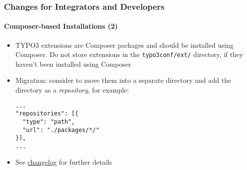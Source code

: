 %

\begin{frame}[fragile]
	\frametitle{Changes for Integrators and Developers}
	\framesubtitle{Composer-based Installations (2)}


	\begin{itemize}
		\item TYPO3 extensions are Composer packages and should be installed using
			Composer. Do not store extensions in the \texttt{typo3conf/ext/}
			directory, if they haven't been installed using Composer
		\item Migration: consider to move them into a separate directory and add
			the directory as a \textit{repository}, for example:

\begin{lstlisting}
...
"repositories": [{
  "type": "path",
  "url": "./packages/*/"
}],
...
\end{lstlisting}

		\item See
			\href{https://docs.typo3.org/c/typo3/cms-core/master/en-us/Changelog/master/Deprecation-94996-InComposerModeAllExtensionsShouldBeInstalledWithComposer.html}{changelog}
			for further details
	\end{itemize}
\end{frame}


